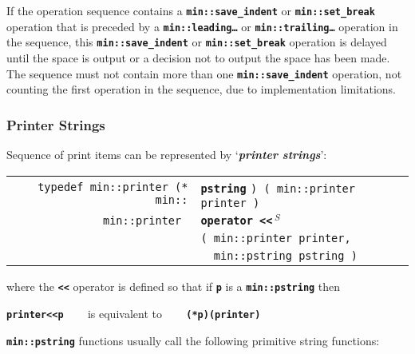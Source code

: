 \documentclass[12pt]{article}
\makeatletter
\newcommand{\TT}[1]{{\tt \bfseries #1}}
\newcommand{\skey}[2]{{\bf \em #1#2}\index{#1}}
\newcommand{\ttindex}[1]{\index{#1@{\tt #1}}}
\newcommand{\ttomkey}[3]{\TT{operator #2}\index{#1@{\tt operator #2}!{#3}}}
\newcommand{\EOL}{\penalty \exhyphenpenalty}
\newenvironment{indpar}[1][0.3in]%
	{\begin{list}{}%
		     {\setlength{\itemsep}{0in}%
		      \setlength{\topsep}{0in}%
		      \setlength{\parsep}{1ex}%
		      \setlength{\labelwidth}{#1}%
		      \setlength{\leftmargin}{#1}%
		      \addtolength{\leftmargin}{\labelsep}}%
	 \item}%
	{\end{list}}
\newcommand{\LABEL}[1]{\label{#1}}
\newlength{\ARGBREAKLENGTH}
\newcommand{\ARGBREAK}[1][\ARGBREAKLENGTH]{\\&\hspace*{#1}}
\newcommand{\TTOMKEY}[3]{\ttomkey{#1}{#2}{#3}}
\newcommand{\MINKEY}[1]%
	   {\TT{#1}\ttindex{min::#1}\ttindex{#1}}
\newcommand{\RESIZE}{$\,^S$}
\makeatother
\begin{document}
If the operation sequence contains a
\TT{min::save\_indent}\label{LEADING-TRAILING-SAVE-INDENT}
or \TT{min::set\_break} operation\label{LEADING-TRAILING-SET-BREAK}
that is preceded by a \TT{min::leading\ldots} or \TT{min::trailing\ldots}
operation in the sequence, this
\TT{min::save\_indent} or \TT{min::set\_break} operation
is delayed until the space is output or a decision not to output
the space has been made.
The sequence must not contain more than one \TT{min::save\_indent}
operation, not counting the first operation in the sequence,
due to implementation limitations.


\subsubsection{Printer Strings}
\label{PRINTER-STRINGS}

Sequence of print items can be represented by `\skey{printer string}s':

\begin{indpar}\begin{tabular}{r@{}l}
\verb|typedef min::printer (* min::| & \MINKEY{pstring}
				       \verb|) ( min::printer printer )|
\LABEL{MIN::PSTRING} \\
\verb|min::printer |
    & \TTOMKEY{<<}{<{}<\RESIZE}%
              {of {\tt min::pstring}}\ARGBREAK
      \verb|( min::printer printer,|\ARGBREAK
      \verb|  min::pstring pstring )|
\LABEL{PRINTER_OPERATOR<<_OF_PSTRING} \\
\end{tabular}\end{indpar}

where the \TT{<{}<} operator is defined so that if \TT{p} is a
\TT{min::\EOL pstring} then
\begin{center}
\TT{printer<{}<p} ~~~ is equivalent to ~~~ \TT{(*p)(printer)}
\end{center}

\TT{min::pstring} functions usually call the following primitive
string functions:
\end{document}
